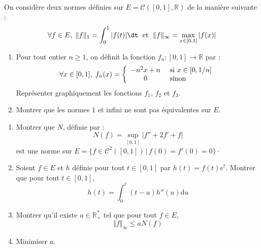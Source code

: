 \documentclass[a4paper,10pt]{report}
\begin{document}
\begin{Exercice}{} On considère deux normes définies sur $E= \mathcal{C}([0,1], \mathbb{R})$ de la manière suivante :
$$ \forall f \in E, \; \Vert f \Vert_1 = \int_0^1 \vert f(t) \vert \dt \; \hbox{ et } \; \Vert f \Vert_{\infty} = \max_{x \in [0,1]} \vert f(x) \vert$$
\begin{enumerate}
\item Pour tout entier $n \geq 1$, on définit la fonction $f_n : [0,1] \rightarrow \mathbb{R}$ par :
$$ \forall x \in [0,1], \; f_n(x) = \left\lbrace \begin{array}{cl}
-n^2x+n & \hbox{ si } x \in [0,1/n] \\
0 & \hbox{ sinon}
\end{array}\right.$$
Représenter graphiquement les fonctions $f_1$, $f_2$ et $f_3$.
\item Montrer que les normes $1$ et infini ne sont pas équivalentes sur $E$.
\end{enumerate}
\end{Exercice}

\begin{Exercice}{}
\begin{enumerate}
\item Montrer que $N$, définie par :
$$ N(f) = \sup_{[0,1]} \vert f''+2f'+f \vert $$
est une norme sur $E = \lbrace f \in \mathcal{C}^2([0,1]) \, \vert \, f(0)=f'(0)=0 \rbrace \cdot$
\item Soient $f \in E$ et $h$ définie pour tout $t \in [0,1]$ par $h(t)=f(t)e^t$. Montrer que pour tout $t \in [0,1]$,
$$ h(t) = \int_{0}^t (t-u) h''(u) \textrm{d}u$$
\item Montrer qu'il existe $a \in \mathbb{R}_+^{*}$ tel que pour tout $f \in E$,
$$ \Vert f \Vert_{\infty} \leq a N(f)$$
\item Minimiser $a$.
\end{enumerate}
\end{Exercice}
\end{document}
